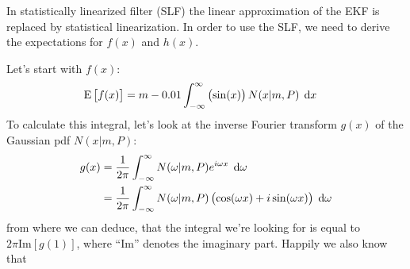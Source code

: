 \documentclass[a4paper,oneside,article]{memoir}
\begin{document}
\subsubsection{}\label{sec:4_1b}

In statistically linearized filter (SLF) the linear approximation
of the EKF is replaced by statistical linearization. In order to use
the SLF, we need to derive the expectations for $f(x)$ and $h(x)$.

Let's start with $f(x)$:
\begin{align}
	\E{f(x)}&=m-0.01\defint{-\infty}{\infty}{\left(\sin(x)\right)N(x|m,P)}{x}
\end{align}
To calculate this integral, let's look at the inverse Fourier transform $g(x)$ of the Gaussian pdf $N(x|m,P)$:
\begin{align}
	g(x)&=\frac{1}{2\pi}\defint{-\infty}{\infty}{N(\omega|m,P)e^{i\omega x}}{\omega}\\
	&=\frac{1}{2\pi}\defint{-\infty}{\infty}{N(\omega|m,P)\left(\cos(\omega x)+i\sin(\omega x)\right)}{\omega}
\end{align}
from where we can deduce, that the integral we're looking for is equal to $2\pi\mathrm{Im}[g(1)]$, where
``Im'' denotes the imaginary part. Happily we also know that
\end{document}
